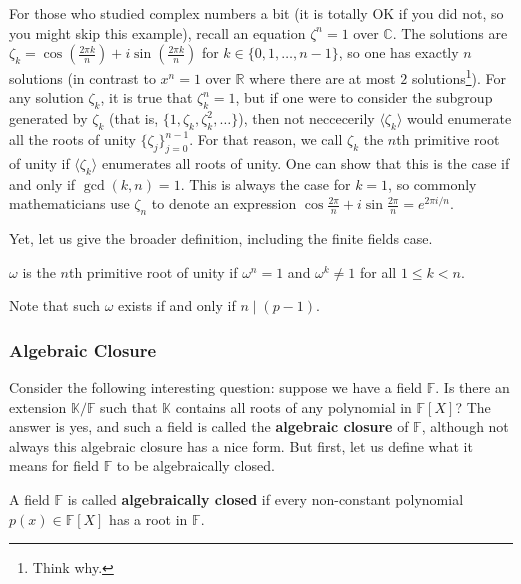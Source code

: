 \documentclass[../lecture-notes.tex]{subfiles}
\begin{document}
\begin{example}
    For those who studied complex numbers a bit (it is totally OK if you did not, so you might skip this example), recall an equation $\zeta^n=1$ over $\mathbb{C}$. The solutions are $\zeta_k = \cos\left(\frac{2\pi k}{n}\right) + i\sin\left(\frac{2\pi k}{n}\right)$ for $k\in\{0,1,\dots,n-1\}$, so one has exactly $n$ solutions (in contrast to $x^n=1$ over $\mathbb{R}$ where there are at most $2$ solutions\footnote{Think why.}). For any solution $\zeta_k$, it is true that $\zeta_k^n=1$, but if one were to consider the subgroup generated by $\zeta_k$ (that is, $\{1,\zeta_k, \zeta_k^2,\dots\}$), then not neccecerily $\langle \zeta_k \rangle$ would enumerate all the roots of unity $\{\zeta_j\}_{j=0}^{n-1}$. For that reason, we call $\zeta_k$ the $n$th primitive root of unity if $\langle \zeta_k \rangle$ enumerates all roots of unity. One can show that this is the case if and only if $\gcd(k,n)=1$. This is always the case for $k=1$, so commonly mathematicians use $\zeta_n$ to denote an expression $\cos \frac{2\pi}{n} + i\sin\frac{2\pi}{n} = e^{2\pi i/n}$.
\end{example}

Yet, let us give the broader definition, including the finite fields case.

\begin{definition}
    $\omega$ is the $n$th primitive root of unity if $\omega^n=1$ and $\omega^k \neq 1$ for all $1 \leq k < n$.
\end{definition}

Note that such $\omega$ exists if and only if $n \mid (p-1)$. 

\subsubsection{Algebraic Closure}

Consider the following interesting question: suppose we have a field $\mathbb{F}$. Is there an extension $\mathbb{K}/\mathbb{F}$ such that $\mathbb{K}$ contains all roots of any polynomial in $\mathbb{F}[X]$? The answer is yes, and such a field is called the \textbf{algebraic closure} of $\mathbb{F}$, although not always this algebraic closure has a nice form. But first, let us define what it means for field $\mathbb{F}$ to be algebraically closed.

\begin{definition}
    A field $\mathbb{F}$ is called \textbf{algebraically closed} if every non-constant polynomial $p(x) \in \mathbb{F}[X]$ has a root in $\mathbb{F}$.
\end{definition}
\end{document}
